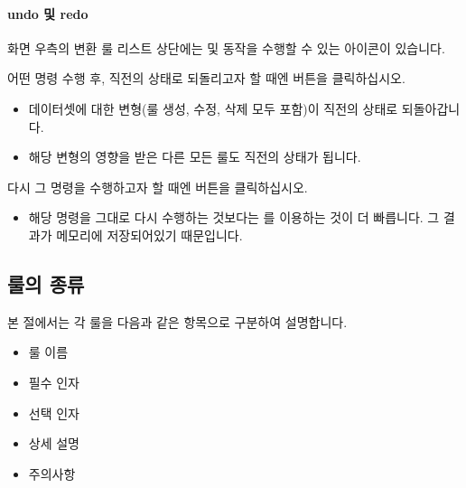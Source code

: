 \documentclass[letterpaper,10pt,english]{sphinxmanual}
\begin{document}
\paragraph{undo 및 redo}
\label{\detokenize{discovery/part07/edit_rules:undo-redo}}
화면 우측의 변환 룰 리스트 상단에는  및  동작을 수행할 수 있는 아이콘이 있습니다.
\begin{quote}

\begin{figure}[H]
\centering

\noindent{}
\end{figure}
\end{quote}

어떤 명령 수행 후, 직전의 상태로 되돌리고자 할 때엔  버튼을 클릭하십시오.
\begin{itemize}
\item {} 
데이터셋에 대한 변형(룰 생성, 수정, 삭제 모두 포함)이 직전의 상태로 되돌아갑니다.

\item {} 
해당 변형의 영향을 받은 다른 모든 룰도 직전의 상태가 됩니다.

\end{itemize}

다시 그 명령을 수행하고자 할 때엔  버튼을 클릭하십시오.
\begin{itemize}
\item {} 
해당 명령을 그대로 다시 수행하는 것보다는 를 이용하는 것이 더 빠릅니다. 그 결과가 메모리에 저장되어있기 때문입니다.

\end{itemize}


\subsection{룰의 종류}
\label{\detokenize{discovery/part07/rule_kinds:id1}}\label{\detokenize{discovery/part07/rule_kinds::doc}}
본 절에서는 각 룰을 다음과 같은 항목으로 구분하여 설명합니다.
\begin{itemize}
\item {} 
룰 이름

\item {} 
필수 인자

\item {} 
선택 인자

\item {} 
상세 설명

\item {} 
주의사항

\end{itemize}
\end{document}
